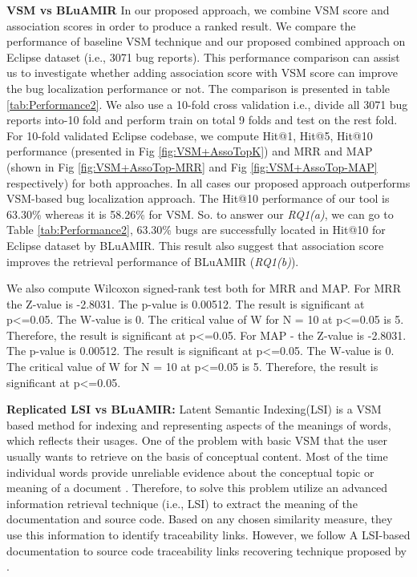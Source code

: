 \documentclass[conference]{IEEEtran}
\begin{document}
\textbf{VSM vs BLuAMIR}
In our proposed approach, we combine VSM score and association scores in order to produce a ranked result. We compare the performance of baseline VSM technique and our proposed combined approach on Eclipse dataset (i.e., 3071 bug reports). This performance comparison can assist us to investigate whether adding association score with VSM score can improve the bug localization performance or not. The comparison is presented in table \ref{tab:Performance2}. We also use a 10-fold cross validation i.e., divide all 3071 bug reports into-10 fold and perform train on total 9 folds and test on the rest fold. For 10-fold validated Eclipse codebase, we compute Hit@1, Hit@5, Hit@10 performance (presented in Fig \ref{fig:VSM+AssoTopK}) and MRR and MAP (shown in Fig \ref{fig:VSM+AssoTop-MRR} and Fig \ref{fig:VSM+AssoTop-MAP} respectively) for both approaches. In all cases our proposed approach outperforms VSM-based bug localization approach. The Hit@10 performance of our tool is 63.30\% whereas it is 58.26\% for VSM.
So. to answer our \textit{RQ1(a)}, we can go to Table \ref{tab:Performance2}, 63.30\% bugs are successfully located in Hit@10 for Eclipse dataset by BLuAMIR. This result also suggest that association score improves the retrieval performance of BLuAMIR (\textit{RQ1(b)}). 


We also compute Wilcoxon signed-rank test both for MRR and MAP. For MRR the {Z}-value is -2.8031. The {p}-value is 0.00512. The result is significant at p<=0.05. The W-value is 0. The critical value of W for N = 10 at p<=0.05 is 5. Therefore, the result is significant at p<=0.05.
For MAP - the {Z}-value is -2.8031. The {p}-value is 0.00512. The result is significant at p<=0.05. The W-value is 0. The critical value of W for N = 10 at p<=0.05 is 5. Therefore, the result is significant at p<=0.05.


\textbf{Replicated LSI vs BLuAMIR:}
Latent Semantic Indexing(LSI) is a VSM based method for indexing and representing aspects of the meanings of words, which reflects their usages. One of the problem with basic VSM that the user usually wants to retrieve on the basis of conceptual content. Most of the time individual words provide unreliable evidence about the conceptual topic or meaning of a document \cite{LSIindexing}. Therefore, to solve this problem \cite{Maletic, MarcusMaletic} utilize an advanced information retrieval technique (i.e., LSI) to extract the meaning of the documentation and source code. Based on any chosen similarity measure, they use this information to identify traceability links. However, we follow A LSI-based documentation to source code traceability links recovering technique proposed by \citet{MarcusLSI}.
\end{document}
